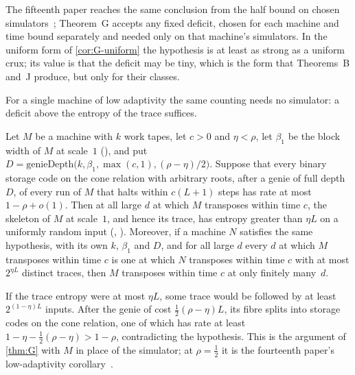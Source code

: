 The fifteenth paper reaches the same conclusion from the half bound on chosen simulators~\cite{HighRate2026}; Theorem~G accepts any
fixed deficit, chosen for each machine and time bound separately and needed only on that machine's simulators. In the uniform form of
\cref{cor:G-uniform} the hypothesis is at least as strong as a uniform crux; its value is that the deficit may be tiny, which is the
form that Theorems~B and~J produce, but only for their classes.

For a single machine of low adaptivity the same counting needs no simulator: a deficit above the entropy of the trace suffices.

\begin{corollary}\label{cor:G-low}
Let $M$ be a machine with $k$ work tapes, let $c>0$ and $\eta<\rho$, let $\beta_1$ be the block width of $M$ at scale~$1$
(), and put $D=\mathrm{genieDepth}\bigl(k,\beta_1,\max(c,1),(\rho-\eta)/2\bigr)$. Suppose that every binary storage code on
the cone relation with arbitrary roots, after a genie of full depth $D$, of every run of $M$ that halts within $c(L+1)$ steps has rate at most
$1-\rho+o(1)$. Then at all large $d$ at which $M$ transposes within time $c$, the skeleton of $M$ at scale~$1$, and hence its trace, has
entropy greater than $\eta L$ on a uniformly random input (, ).
Moreover, if a machine $N$ satisfies the same hypothesis, with its own $k$, $\beta_1$ and $D$, and for all large $d$ every $d$ at which $M$
transposes within time $c$ is one at which $N$ transposes within time $c$ with at most $2^{\eta L}$ distinct traces, then $M$ transposes
within time $c$ at only finitely many~$d$.
\end{corollary}

\begin{outline}
If the trace entropy were at most $\eta L$, some trace would be followed by at least $2^{(1-\eta)L}$ inputs. After the genie of cost
$\frac12(\rho-\eta)L$, its fibre splits into storage codes on the cone relation, one of which has rate at least
$1-\eta-\frac12(\rho-\eta)>1-\rho$, contradicting the hypothesis. This is the argument of \cref{thm:G} with $M$ in place of the
simulator; at $\rho=\frac12$ it is the fourteenth paper's low-adaptivity corollary~\cite[Corollary~L]{BoundedStack2026}.
\end{outline}


